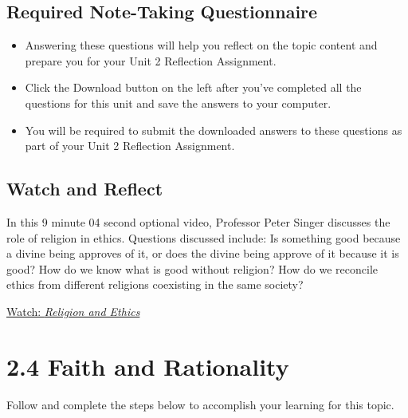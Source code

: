 \documentclass[
]{book}
\providecommand{\tightlist}{%
  \setlength{\itemsep}{0pt}\setlength{\parskip}{0pt}}
\begin{document}
\hypertarget{required-note-taking-questionnaire-6}{%
\subsection*{Required Note-Taking Questionnaire}\label{required-note-taking-questionnaire-6}}

\begin{reflect}
\begin{itemize}
\tightlist
\item
  Answering these questions will help you reflect on the topic content and prepare you for your Unit 2 Reflection Assignment.
\item
  Click the Download button on the left after you've completed all the questions for this unit and save the answers to your computer.
\item
  You will be required to submit the downloaded answers to these questions as part of your Unit 2 Reflection Assignment.
\end{itemize}
\end{reflect}

\hypertarget{watch-and-reflect-13}{%
\subsection*{Watch and Reflect}\label{watch-and-reflect-13}}

\begin{reflect}
In this 9 minute 04 second optional video, Professor Peter Singer discusses the role of religion in ethics. Questions discussed include: Is something good because a divine being approves of it, or does the divine being approve of it because it is good? How do we know what is good without religion? How do we reconcile ethics from different religions coexisting in the same society?

\href{https://www.youtube.com/watch?v=w9QtjQ5Ow7Y}{Watch: \emph{Religion and Ethics}}
\end{reflect}

\hypertarget{faith-and-rationality}{%
\section*{2.4 Faith and Rationality}\label{faith-and-rationality}}

Follow and complete the steps below to accomplish your learning for this topic.
\end{document}
